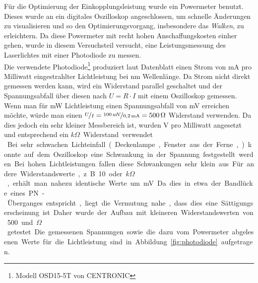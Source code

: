 
Für die Optimierung der Einkopplungsleistung wurde ein Powermeter benutzt. Dieses wurde an ein digitales Oszilloskop angeschlossen, um schnelle Änderungen zu visualisieren und so den Optimierungsvorgang, insbesondere das \textit{Walken}, zu erleichtern. Da diese Powermeter mit recht hohen Anschaffungskosten einher gehen, wurde in diesem Versuchsteil versucht, eine Leistungsmessung des Laserlichtes mit einer Photodiode zu messen.\\

Die verwendete Photodiode\footnote{Modell OSD15-5T von CENTRONIC\cite{farnell.com_osd15-5t_????}} produziert laut Datenblatt einen Strom von \unit[0,18-0,21]{mA} pro Milliwatt eingestrahlter Lichtleistung bei \unit[436]{nm} Wellenlänge. Da Strom nicht direkt gemessen werden kann, wird ein Widerstand parallel geschaltet und der Spannungsabfall über diesen nach $U=R\cdot I$ mit einem Oszilloskop gemessen. Wenn man für \unit[1]{mW} Lichtleistung einen Spannungsabfall von \unit[100]{mV} erreichen möchte, würde man einen $\nicefrac{U}{I}=\nicefrac{\unit[100]{mV}}{\unit[0,2]{mA}}=\unit[500]{\Omega}$ Widerstand verwenden. Da dies jedoch ein sehr kleiner Messbereich ist, wurden \unit[4]{V} pro Milliwatt angesetzt und entsprechend ein \unit[20]{$k\Omega$} Widerstand verwendet.\\

Bei sehr schwachen Lichteinfall (Deckenlampe, Fenster aus der Ferne, ...) konnte auf dem Oszilloskop eine Schwankung in der Spannung festgestellt werden. Bei hohen Lichtleistungen fallen diese Schwankungen sehr klein aus. Für andere Widerstandswerte, z.B. 10 oder \unit[100]{$k\Omega$}, erhält man nahezu identische Werte um \unit[440]{mV}. Da dies in etwa der Bandlücke eines PN-Überganges entspricht, liegt die Vermutung nahe, dass dies eine Sättigungserscheinung ist.

Daher wurde der Aufbau mit kleineren Widerstandswerten von 500 und \unit[1000]{$\Omega$} getestet. Die gemessenen Spannungen sowie die dazu vom Powermeter abgelesenen Werte für die Lichtleistung sind in Abbildung~\ref{fig:photodiode} aufgetragen.


